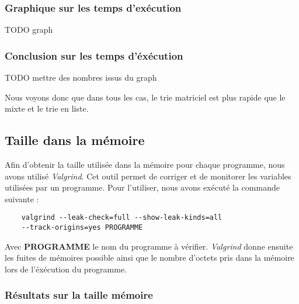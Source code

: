 \subsubsection*{Graphique sur les temps d'exécution}
TODO graph

\subsubsection*{Conclusion sur les temps d'éxécution}
TODO mettre des nombres issus du graph

Nous voyons donc que dans tous les cas, le trie matriciel est plus rapide que le mixte
et le trie en liste.

\subsection{Taille dans la mémoire}
Afin d'obtenir la taille utilisée dans la mémoire pour chaque programme, nous avons
utilisé \emph{Valgrind}. Cet outil permet de corriger et de monitorer les variables
utilisées par un programme. Pour l'utiliser, nous avons exécuté la commande suivante :
\begin{verbatim}
    valgrind --leak-check=full --show-leak-kinds=all
    --track-origins=yes PROGRAMME
\end{verbatim}
Avec \textbf{PROGRAMME} le nom du programme à vérifier. \emph{Valgrind} donne ensuite les fuites
de mémoires possible ainsi que le nombre d'octets pris dans la mémoire lors de
l'éxécution du programme.

\subsubsection*{Résultats sur la taille mémoire}

